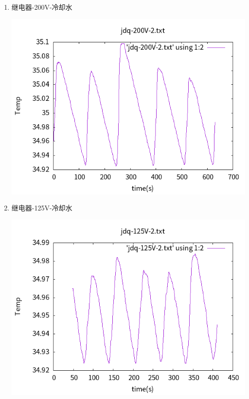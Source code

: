 \documentclass[11pt]{report}
\begin{document}
\begin{enumerate}
\begin{enumerate}
\begin{center}
\end{center}
\item 继电器-200V-冷却水
\label{sec:org1f8513f}
\begin{center}
\includegraphics[width=.9\linewidth]{../img/jdq-200V-2.txt.png}
\end{center}
\item 继电器-125V-冷却水
\label{sec:orgb239e90}
\begin{center}
\includegraphics[width=.9\linewidth]{../img/jdq-125V-2.txt.png}
\end{center}
\end{enumerate}
\end{enumerate}
\end{document}
